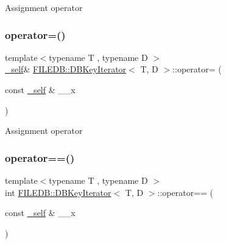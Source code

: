Assignment operator \mbox{\label{classFILEDB_1_1DBKeyIterator_adfa49c128d637dae0263553529126575}} 
\subsubsection{\texorpdfstring{operator=()}{operator=()}\hspace{0.1cm}{\footnotesize\ttfamily [2/2]}}
{\footnotesize\ttfamily template$<$typename T , typename D $>$ \\
\mbox{\hyperlink{classFILEDB_1_1DBKeyIterator_aaf7773c7a848ec6e04bc738dd794ace1}{\+\_\+self}}\& \mbox{\hyperlink{classFILEDB_1_1DBKeyIterator}{F\+I\+L\+E\+D\+B\+::\+D\+B\+Key\+Iterator}}$<$ T, D $>$\+::operator= (\begin{DoxyParamCaption}\item[{const \mbox{\hyperlink{classFILEDB_1_1DBKeyIterator_aaf7773c7a848ec6e04bc738dd794ace1}{\+\_\+self}} \&}]{\+\_\+\+\_\+x }\end{DoxyParamCaption})\hspace{0.3cm}{\ttfamily [inline]}}

Assignment operator \mbox{\label{classFILEDB_1_1DBKeyIterator_ab6d1aad1d07c4ee9a1edeadf6610c6f4}} 
\subsubsection{\texorpdfstring{operator==()}{operator==()}\hspace{0.1cm}{\footnotesize\ttfamily [1/2]}}
{\footnotesize\ttfamily template$<$typename T , typename D $>$ \\
int \mbox{\hyperlink{classFILEDB_1_1DBKeyIterator}{F\+I\+L\+E\+D\+B\+::\+D\+B\+Key\+Iterator}}$<$ T, D $>$\+::operator== (\begin{DoxyParamCaption}\item[{const \mbox{\hyperlink{classFILEDB_1_1DBKeyIterator_aaf7773c7a848ec6e04bc738dd794ace1}{\+\_\+self}} \&}]{\+\_\+\+\_\+x }\end{DoxyParamCaption})\hspace{0.3cm}{\ttfamily [inline]}}

